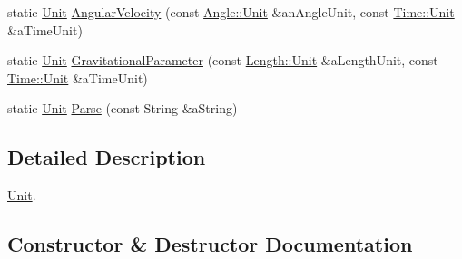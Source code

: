 \begin{DoxyCompactItemize}
\item 
static \hyperlink{classostk_1_1physics_1_1units_1_1_derived_1_1_unit}{Unit} \hyperlink{classostk_1_1physics_1_1units_1_1_derived_1_1_unit_ae6790769634dedf4d2406a6bc1818cd3}{Angular\+Velocity} (const \hyperlink{classostk_1_1physics_1_1units_1_1_angle_aea1f8018b1d378b9dee56959d8eb9def}{Angle\+::\+Unit} \&an\+Angle\+Unit, const \hyperlink{classostk_1_1physics_1_1units_1_1_time_aa961f0dbca7ec297e19e15e0dfa3bb4a}{Time\+::\+Unit} \&a\+Time\+Unit)
\item 
static \hyperlink{classostk_1_1physics_1_1units_1_1_derived_1_1_unit}{Unit} \hyperlink{classostk_1_1physics_1_1units_1_1_derived_1_1_unit_a727048d3d3d059a00cb33e2f5fff5e55}{Gravitational\+Parameter} (const \hyperlink{classostk_1_1physics_1_1units_1_1_length_a2664470a7eedf5d45c88861fe69badea}{Length\+::\+Unit} \&a\+Length\+Unit, const \hyperlink{classostk_1_1physics_1_1units_1_1_time_aa961f0dbca7ec297e19e15e0dfa3bb4a}{Time\+::\+Unit} \&a\+Time\+Unit)
\item 
static \hyperlink{classostk_1_1physics_1_1units_1_1_derived_1_1_unit}{Unit} \hyperlink{classostk_1_1physics_1_1units_1_1_derived_1_1_unit_ac3e970d9e6ac3b658cf5ff823dd6def6}{Parse} (const String \&a\+String)
\end{DoxyCompactItemize}


\subsection{Detailed Description}
\hyperlink{classostk_1_1physics_1_1units_1_1_derived_1_1_unit}{Unit}. 

\subsection{Constructor \& Destructor Documentation}
\mbox{\label{classostk_1_1physics_1_1units_1_1_derived_1_1_unit_a2f40f9bd4c0d94f13c5a4cd4e6d7a91c}} 
